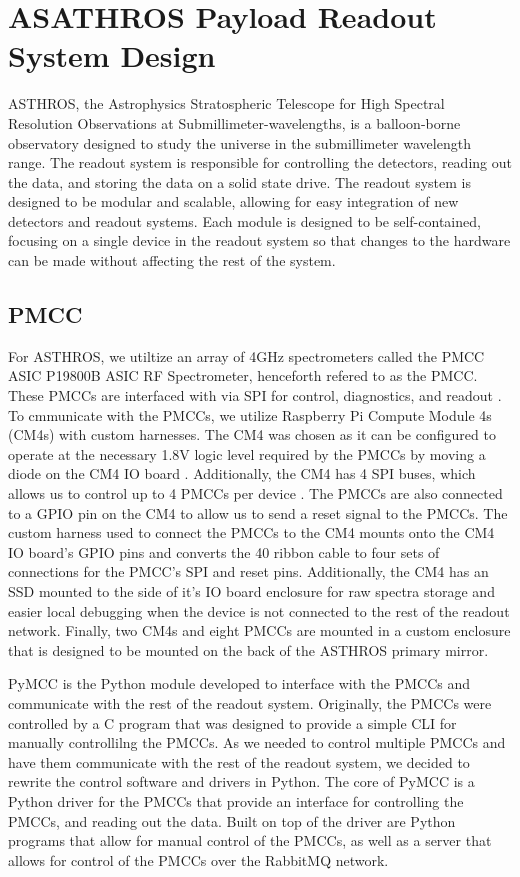 \chapter[ASATHROS Payload Readout System Design]{ASATHROS Payload Readout System Design}
ASTHROS, the Astrophysics Stratospheric Telescope for High Spectral Resolution Observations at Submillimeter-wavelengths, is a balloon-borne observatory designed to study the universe in the submillimeter wavelength range.
The readout system is responsible for controlling the detectors, reading out the data, and storing the data on a solid state drive.
The readout system is designed to be modular and scalable, allowing for easy integration of new detectors and readout systems.
Each module is designed to be self-contained, focusing on a single device in the readout system so that changes to the hardware can be made without affecting the rest of the system.



\section{PMCC}
For ASTHROS, we utiltize an array of 4GHz spectrometers called the PMCC ASIC P19800B ASIC RF Spectrometer, henceforth refered to as the PMCC.
These PMCCs are interfaced with via SPI for control, diagnostics, and readout \cite{PMCCP19800B}.
To cmmunicate with the PMCCs, we utilize Raspberry Pi Compute Module 4s (CM4s) with custom harnesses.
The CM4 was chosen as it can be configured to operate at the necessary 1.8V logic level required by the PMCCs by moving a diode on the CM4 IO board \cite{cm4io}.
Additionally, the CM4 has 4 SPI buses, which allows us to control up to 4 PMCCs per device \cite{cm4}.
The PMCCs are also connected to a GPIO pin on the CM4 to allow us to send a reset signal to the PMCCs.
The custom harness used to connect the PMCCs to the CM4 mounts onto the CM4 IO board's GPIO pins and converts the 40 ribbon cable to four sets of connections for the PMCC's SPI and reset pins.
Additionally, the CM4 has an SSD mounted to the side of it's IO board enclosure for raw spectra storage and easier local debugging when the device is not connected to the rest of the readout network.
Finally, two CM4s and eight PMCCs are mounted in a custom enclosure that is designed to be mounted on the back of the ASTHROS primary mirror.

PyMCC is the Python module developed to interface with the PMCCs and communicate with the rest of the readout system.
Originally, the PMCCs were controlled by a C program that was designed to provide a simple CLI for manually controllilng the PMCCs.
As we needed to control multiple PMCCs and have them communicate with the rest of the readout system, we decided to rewrite the control software and drivers in Python.
The core of PyMCC is a Python driver for the PMCCs that provide an interface for controlling the PMCCs, and reading out the data.
Built on top of the driver are Python programs that allow for manual control of the PMCCs, as well as a server that allows for control of the PMCCs over the RabbitMQ network.

